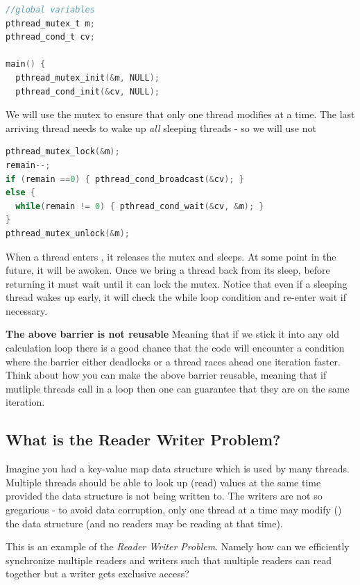 \begin{lstlisting}[language=C]
//global variables
pthread_mutex_t m;
pthread_cond_t cv;

main() {
  pthread_mutex_init(&m, NULL);
  pthread_cond_init(&cv, NULL);
\end{lstlisting}

We will use the mutex to ensure that only one thread modifies  at a time. The last arriving thread needs to wake up \emph{all} sleeping threads - so we will use  not 

\begin{lstlisting}[language=C]
pthread_mutex_lock(&m);
remain--; 
if (remain ==0) { pthread_cond_broadcast(&cv); }
else {
  while(remain != 0) { pthread_cond_wait(&cv, &m); }
}
pthread_mutex_unlock(&m);
\end{lstlisting}

When a thread enters , it releases the mutex and sleeps. At some point in the future, it will be awoken. Once we bring a thread back from its sleep, before returning it must wait until it can lock the mutex. Notice that even if a sleeping thread wakes up early, it will check the while loop condition and re-enter wait if necessary.

\textbf{The above barrier is not reusable} Meaning that if we stick it into any old calculation loop there is a good chance that the code will encounter a condition where the barrier either deadlocks or a thread races ahead one iteration faster. Think about how you can make the above barrier reusable, meaning that if mutliple threads call  in a loop then one can guarantee that they are on the same iteration.

\subsection{What is the Reader Writer Problem?}\label{what-is-the-reader-writer-problem}

Imagine you had a key-value map data structure which is used by many threads. Multiple threads should be able to look up (read) values at the same time provided the data structure is not being written to. The writers are not so gregarious - to avoid data corruption, only one thread at a time may modify () the data structure (and no readers may be reading at that time).

This is an example of the \emph{Reader Writer Problem}. Namely how can we efficiently synchronize multiple readers and writers such that multiple readers can read together but a writer gets exclusive access?

